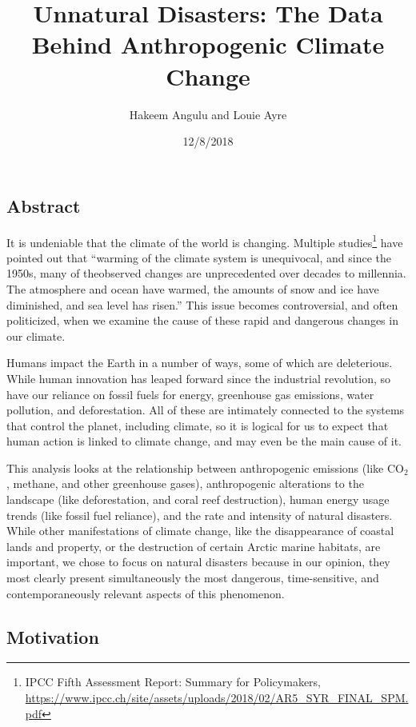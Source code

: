 \documentclass[10pt,]{article}
\title{Unnatural Disasters: The Data Behind Anthropogenic Climate Change}
\author{Hakeem Angulu and Louie Ayre}
\date{12/8/2018}
\let\rmarkdownfootnote\footnote%
\def\footnote{\protect\rmarkdownfootnote}
\begin{document}
\maketitle

\subsection{Abstract}\label{abstract}

It is undeniable that the climate of the world is changing. Multiple
studies\footnote{IPCC Fifth Assessment Report: Summary for Policymakers,
  \url{https://www.ipcc.ch/site/assets/uploads/2018/02/AR5_SYR_FINAL_SPM.pdf}}
have pointed out that ``warming of the climate system is unequivocal,
and since the 1950s, many of theobserved changes are unprecedented over
decades to millennia. The atmosphere and ocean have warmed, the amounts
of snow and ice have diminished, and sea level has risen.'' This issue
becomes controversial, and often politicized, when we examine the cause
of these rapid and dangerous changes in our climate.

Humans impact the Earth in a number of ways, some of which are
deleterious. While human innovation has leaped forward since the
industrial revolution, so have our reliance on fossil fuels for energy,
greenhouse gas emissions, water pollution, and deforestation. All of
these are intimately connected to the systems that control the planet,
including climate, so it is logical for us to expect that human action
is linked to climate change, and may even be the main cause of it.

This analysis looks at the relationship between anthropogenic emissions
(like CO\(_2\), methane, and other greenhouse gases), anthropogenic
alterations to the landscape (like deforestation, and coral reef
destruction), human energy usage trends (like fossil fuel reliance), and
the rate and intensity of natural disasters. While other manifestations
of climate change, like the disappearance of coastal lands and property,
or the destruction of certain Arctic marine habitats, are important, we
chose to focus on natural disasters because in our opinion, they most
clearly present simultaneously the most dangerous, time-sensitive, and
contemporaneously relevant aspects of this phenomenon.

\subsection{Motivation}\label{motivation}
\end{document}
